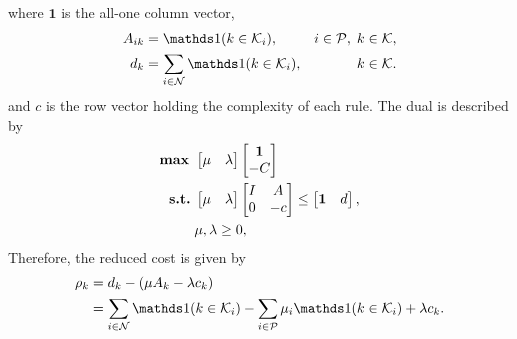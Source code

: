 where $\bm{1}$ is the all-one column vector,
\begin{align*}
    A_{ik} &= \Ind(k \in \K_i), & i \in \P, \; k \in \K, \\
    d_k &= \sum_{i \in \N} \Ind(k \in \K_i), & k \in \K. \\
\end{align*}
and $c$ is the row vector holding the complexity of each rule.
The dual is described by
\begin{equation}\label{eq:BM_dual_vector}
    \begin{split}
        \text{\textbf{max }} & \begin{bmatrix}
                   \mu & \lambda
        \end{bmatrix} \begin{bmatrix}
                          \bm{1} \\ -C
        \end{bmatrix} \\
        \text{\textbf{s.t.}}\; & \begin{bmatrix}
                  \mu & \lambda
        \end{bmatrix} \begin{bmatrix}
                          I & A \\ 0 & -c
        \end{bmatrix}
        \leq \begin{bmatrix}
                 \bm{1} & d
        \end{bmatrix}, \\
        & \mu, \lambda \geq 0,
    \end{split}
\end{equation}
Therefore, the reduced cost is given by
\begin{equation}\label{eq:BP_redcost_vector_derivation}
    \begin{split}
        \rho_k &= d_k - \left(\mu A_k - \lambda c_k\right)
        \\ &= \sum_{i \in \N} \Ind(k \in \K_i) - \sum_{i \in \P} \mu_i\Ind(k \in \K_i) + \lambda c_k.
    \end{split}
\end{equation}

